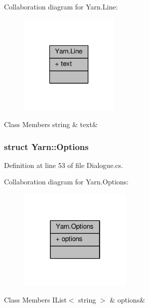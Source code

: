 Collaboration diagram for Yarn.\-Line\-:
\nopagebreak
\begin{figure}[H]
\begin{center}
\leavevmode
\includegraphics[width=136pt]{a00372}
\end{center}
\end{figure}
\begin{DoxyFields}{Class Members}
\hypertarget{a00041_a81d1f04bbb4cf6642d2bd685bda1da20}{string}\label{a00041_a81d1f04bbb4cf6642d2bd685bda1da20}
&
text&
\\
\hline

\end{DoxyFields}
\label{a00362}
\hypertarget{a00041_a00362}{}
\subsubsection{struct Yarn\-:\-:Options}


Definition at line 53 of file Dialogue.\-cs.



Collaboration diagram for Yarn.\-Options\-:
\nopagebreak
\begin{figure}[H]
\begin{center}
\leavevmode
\includegraphics[width=154pt]{a00373}
\end{center}
\end{figure}
\begin{DoxyFields}{Class Members}
\hypertarget{a00041_ae8c616d923ceeeed192a9436c55d9917}{I\-List$<$ string $>$}\label{a00041_ae8c616d923ceeeed192a9436c55d9917}
&
options&
\\
\hline

\end{DoxyFields}
\label{a00355}
\hypertarget{a00041_a00355}{}
